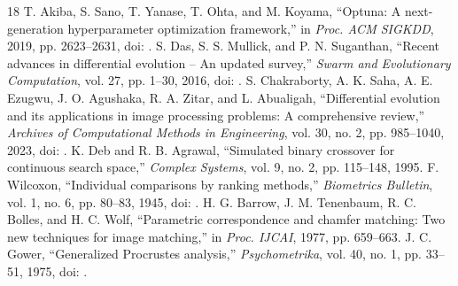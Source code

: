 \begin{thebibliography}{18}
 T. Akiba, S. Sano, T. Yanase, T. Ohta, and M. Koyama, ``Optuna: A next-generation hyperparameter optimization framework,'' in \emph{Proc. ACM SIGKDD}, 2019, pp. 2623--2631, doi: .
 S. Das, S. S. Mullick, and P. N. Suganthan, ``Recent advances in differential evolution -- An updated survey,'' \emph{Swarm and Evolutionary Computation}, vol. 27, pp. 1--30, 2016, doi: .
 S. Chakraborty, A. K. Saha, A. E. Ezugwu, J. O. Agushaka, R. A. Zitar, and L. Abualigah, ``Differential evolution and its applications in image processing problems: A comprehensive review,'' \emph{Archives of Computational Methods in Engineering}, vol. 30, no. 2, pp. 985--1040, 2023, doi: .
 K. Deb and R. B. Agrawal, ``Simulated binary crossover for continuous search space,'' \emph{Complex Systems}, vol. 9, no. 2, pp. 115--148, 1995.
 F. Wilcoxon, ``Individual comparisons by ranking methods,'' \emph{Biometrics Bulletin}, vol. 1, no. 6, pp. 80--83, 1945, doi: .
 H. G. Barrow, J. M. Tenenbaum, R. C. Bolles, and H. C. Wolf, ``Parametric correspondence and chamfer matching: Two new techniques for image matching,'' in \emph{Proc. IJCAI}, 1977, pp. 659--663.
 J. C. Gower, ``Generalized Procrustes analysis,'' \emph{Psychometrika}, vol. 40, no. 1, pp. 33--51, 1975, doi: .
\end{thebibliography}
